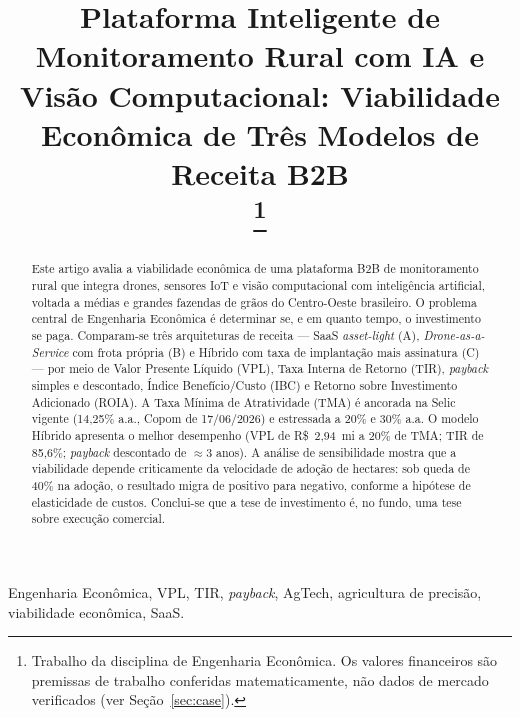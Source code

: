 \documentclass[conference]{IEEEtran}
\newcommand{\rs}{R\$}
\begin{document}
\title{Plataforma Inteligente de Monitoramento Rural com IA e Visão Computacional: Viabilidade Econômica de Três Modelos de Receita B2B\\
\thanks{Trabalho da disciplina de Engenharia Econômica. Os valores financeiros são premissas de trabalho conferidas matematicamente, não dados de mercado verificados (ver Seção~\ref{sec:case}).}}

\author{
}

\maketitle

\begin{abstract}
Este artigo avalia a viabilidade econômica de uma plataforma B2B de monitoramento rural que integra drones, sensores IoT e visão computacional com inteligência artificial, voltada a médias e grandes fazendas de grãos do Centro-Oeste brasileiro. O problema central de Engenharia Econômica é determinar se, e em quanto tempo, o investimento se paga. Comparam-se três arquiteturas de receita --- SaaS \textit{asset-light} (A), \textit{Drone-as-a-Service} com frota própria (B) e Híbrido com taxa de implantação mais assinatura (C) --- por meio de Valor Presente Líquido (VPL), Taxa Interna de Retorno (TIR), \textit{payback} simples e descontado, Índice Benefício/Custo (IBC) e Retorno sobre Investimento Adicionado (ROIA). A Taxa Mínima de Atratividade (TMA) é ancorada na Selic vigente (14,25\% a.a., Copom de 17/06/2026) e estressada a 20\% e 30\% a.a. O modelo Híbrido apresenta o melhor desempenho (VPL de \rs~2{,}94~mi a 20\% de TMA; TIR de 85,6\%; \textit{payback} descontado de $\approx$3 anos). A análise de sensibilidade mostra que a viabilidade depende criticamente da velocidade de adoção de hectares: sob queda de 40\% na adoção, o resultado migra de positivo para negativo, conforme a hipótese de elasticidade de custos. Conclui-se que a tese de investimento é, no fundo, uma tese sobre execução comercial.
\end{abstract}

\begin{IEEEkeywords}
Engenharia Econômica, VPL, TIR, \textit{payback}, AgTech, agricultura de precisão, viabilidade econômica, SaaS.
\end{IEEEkeywords}
\end{document}
